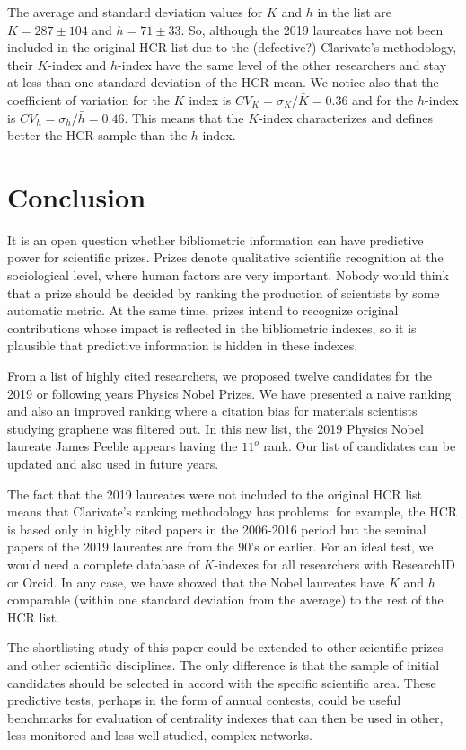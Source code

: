\documentclass[final,3p,times]{elsarticle}
\begin{document}
The average and standard deviation 
values for $K$ and $h$ in the list are
$K = 287 \pm 104$ and $h = 71 \pm 33$. 
So, although 
the 2019 laureates have not been included in the
original HCR list due to the (defective?) 
Clarivate's 
methodology, their $K$-index and
$h$-index have the same level
of the other researchers and
stay at less than one 
standard deviation of the HCR mean.
We notice also that the coefficient of variation
for the $K$ index is $CV_K = \sigma_K/\bar{K} =
0.36$ and for the $h$-index is $CV_h = \sigma_h/\bar{h} = 0.46$. This means that the
$K$-index characterizes and defines better the
HCR sample than the $h$-index.

\section{Conclusion}
\label{S:4}

It is an open question whether bibliometric 
information can have predictive power
for scientific prizes. Prizes  denote qualitative scientific
recognition at the sociological level, where human
factors are very important. Nobody would think that a prize should be decided by ranking the production of scientists by some automatic metric. At the same time,
prizes intend to recognize original contributions whose impact is
reflected in the bibliometric indexes, so it is plausible that
predictive information is hidden in these indexes.

From a list of highly cited researchers, we proposed 
twelve candidates
for the 2019 or following years Physics Nobel Prizes. 
We have presented a naive ranking and also
an improved ranking where a citation bias for materials scientists
studying graphene was filtered out.
In this new list, the 2019 Physics Nobel laureate James Peeble
appears having the $11^o$ rank.
Our list of candidates can be
updated and also used in future years.

The fact that the 2019
laureates were not included to the original 
HCR list means that Clarivate's ranking methodology has problems:
for example, the HCR is based only in highly
cited papers in the 2006-2016 period but the
seminal papers of the 2019 laureates are from
the 90's or earlier. For an ideal test,
we would need a complete database of $K$-indexes
for all researchers with ResearchID or Orcid.
In any case, we have showed that
the Nobel laureates have $K$ and $h$
comparable (within one
standard deviation from the average) 
to the rest of the HCR list.

The shortlisting  study of this paper 
could be extended to other
scientific prizes and other scientific
disciplines. The only difference is that the sample of initial
candidates should be selected in accord with the 
specific scientific area. 
These
predictive tests, perhaps in the form of annual contests,
could be useful benchmarks for evaluation of
centrality indexes that can then be used in other, less monitored and less well-studied, complex networks.
\end{document}

